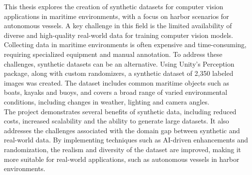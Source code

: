 
This thesis explores the creation of synthetic datasets for computer vision applications in maritime environments, with a focus on harbor scenarios for autonomous vessels. A key challenge in this field is the limited availability of diverse and high-quality real-world data for training computer vision models. Collecting data in maritime environments is often expensive and time-consuming, requiring specialized equipment and manual annotation. To address these challenges, synthetic datasets can be an alternative. Using Unity’s Perception package, along with custom randomizers, a synthetic dataset of 2,350 labeled images was created. The dataset includes common maritime objects such as boats, kayaks and buoys, and covers a broad range of varied environmental conditions, including changes in weather, lighting and camera angles.\\

\noindent The project demonstrates several benefits of synthetic data, including reduced costs, increased scalability and the ability to generate large datasets. It also addresses the challenges associated with the domain gap between synthetic and real-world data. By implementing techniques such as AI-driven enhancements and randomization, the realism and diversity of the dataset are improved, making it more suitable for real-world applications, such as autonomous vessels in harbor environments.
